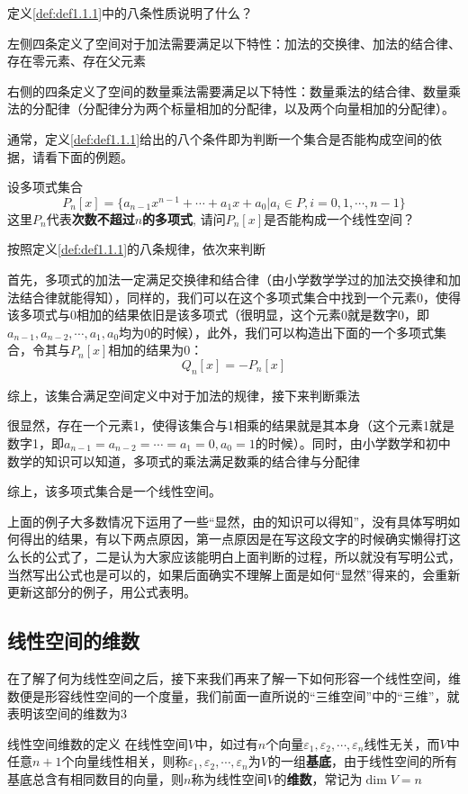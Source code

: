 \documentclass[12pt, a4paper, oneside, UTF8]{ctexbook}
\begin{document}
\begin{rmk}
    定义\ref{def:def1.1.1}中的八条性质说明了什么？

    左侧四条定义了空间对于加法需要满足以下特性：加法的交换律、加法的结合律、存在零元素、存在父元素

    右侧的四条定义了空间的数量乘法需要满足以下特性：数量乘法的结合律、数量乘法的分配律（分配律分为两个标量相加的分配律，以及两个向量相加的分配律）。
\end{rmk}

通常，定义\ref{def:def1.1.1}给出的八个条件即为判断一个集合是否能构成空间的依据，请看下面的例题。

\begin{example}
    设多项式集合\[P_n[x]=\{a_{n-1} x^{n-1}+\cdots+a_1x+a_0 | a_i\in P, i=0,1,\cdots,n-1\} \]
    这里$P_n$代表\textbf{次数不超过$n$的多项式}, 请问$P_n[x]$是否能构成一个线性空间？
\end{example}
\begin{solution}
    按照定义\ref{def:def1.1.1}的八条规律，依次来判断

    首先，多项式的加法一定满足交换律和结合律（由小学数学学过的加法交换律和加法结合律就能得知），同样的，我们可以在这个多项式集合中找到一个元素0，使得该多项式与0相加的结果依旧是该多项式（很明显，这个元素0就是数字0，即$a_{n-1}, a_{n-2},\cdots,a_1, a_0$均为0的时候），此外，我们可以构造出下面的一个多项式集合，令其与$P_n[x]$相加的结果为0：
    \[Q_n[x]=-P_n[x]\]

    综上，该集合满足空间定义中对于加法的规律，接下来判断乘法

    很显然，存在一个元素1，使得该集合与1相乘的结果就是其本身（这个元素1就是数字1，即$a_{n-1}=a_{n-2}=\cdots=a_1=0, a_0=1$的时候）。同时，由小学数学和初中数学的知识可以知道，多项式的乘法满足数乘的结合律与分配律
    
    综上，该多项式集合是一个线性空间。
\end{solution}
\begin{rmk}
    上面的例子大多数情况下运用了一些“显然，由\text{\dots\dots}的知识可以得知”，没有具体写明如何得出的结果，有以下两点原因，第一点原因是在写这段文字的时候确实懒得打这么长的公式了，二是认为大家应该能明白上面判断的过程，所以就没有写明公式，当然写出公式也是可以的，如果后面确实不理解上面是如何“显然”得来的，会重新更新这部分的例子，用公式表明。
\end{rmk}

\subsection{线性空间的维数}
在了解了何为线性空间之后，接下来我们再来了解一下如何形容一个线性空间，维数便是形容线性空间的一个度量，我们前面一直所说的“三维空间”中的“三维”，就表明该空间的维数为3
\begin{defn}{线性空间维数的定义}{}
    在线性空间$V$中，如过有$n$个向量$\varepsilon_1, \varepsilon_2,\cdots, \varepsilon_n$线性无关，而$V$中任意$n+1$个向量线性相关，则称$\varepsilon_1, \varepsilon_2,\cdots, \varepsilon_n$为$V$的一组\textbf{基底}，由于线性空间的所有基底总含有相同数目的向量，则$n$称为线性空间$V$的\textbf{维数}，常记为$\dim V=n$
\end{defn}
\end{document}

